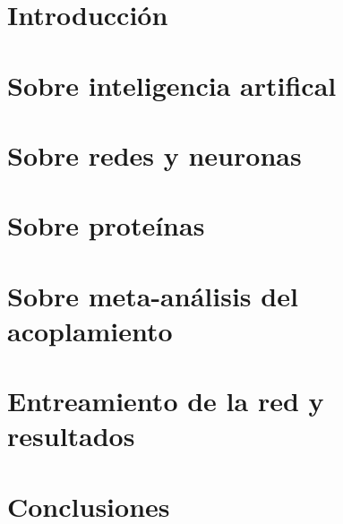 \documentclass[letterpaper,12pt]{book}
\begin{document}
\newpage
\thispagestyle{empty}
\mbox{}
\frontmatter
    
    \tableofcontents

\mainmatter
    \chapter*{Introducción}
        
    \chapter{Sobre inteligencia artifical}
        
    \chapter{Sobre redes y neuronas}
        
    \chapter{Sobre proteínas}
        
    \chapter{Sobre meta-análisis del acoplamiento}
        
    \chapter{Entreamiento de la red y resultados}
        
    \chapter{Conclusiones}
        




\backmatter
    \nocite{*}
    \printbibliography
\end{document}
